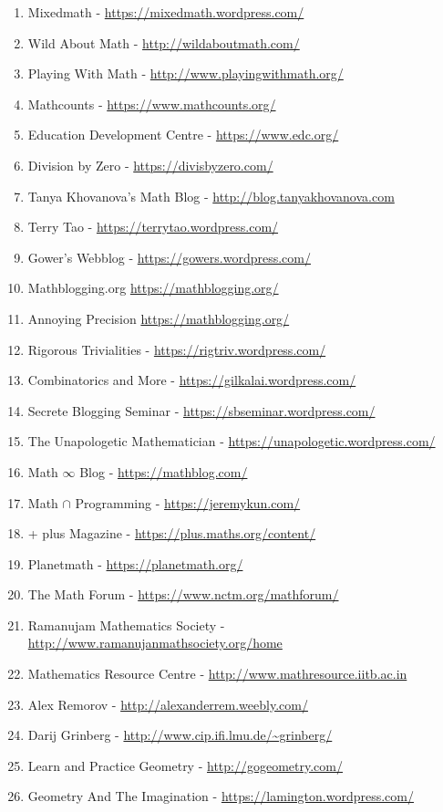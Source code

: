 \documentclass{article}
\begin{document}
\begin{enumerate}
\item Mixedmath - \url{https://mixedmath.wordpress.com/}
\item Wild About Math - \url{http://wildaboutmath.com/}
\item Playing With Math - \url{http://www.playingwithmath.org/}
\item Mathcounts - \url{https://www.mathcounts.org/}
\item Education Development Centre - \url{https://www.edc.org/}
\item Division by Zero - \url{https://divisbyzero.com/}
\item Tanya Khovanova's Math Blog - \url{http://blog.tanyakhovanova.com}
\item Terry Tao - \url{https://terrytao.wordpress.com/}\item Gower's Webblog - \url{https://gowers.wordpress.com/}
\item Mathblogging.org \url{https://mathblogging.org/}
\item Annoying Precision \url{https://mathblogging.org/}
\item Rigorous Trivialities - \url{https://rigtriv.wordpress.com/}
\item Combinatorics and More - \url{https://gilkalai.wordpress.com/}
\item Secrete Blogging Seminar - \url{https://sbseminar.wordpress.com/}
\item The Unapologetic Mathematician - \url{https://unapologetic.wordpress.com/}
\item Math $\infty$ Blog - \url{https://mathblog.com/}
\item Math $\cap $ Programming - \url{https://jeremykun.com/}
\item + plus Magazine - \url{https://plus.maths.org/content/}
\item Planetmath - \url{https://planetmath.org/}
\item The Math Forum - \url{https://www.nctm.org/mathforum/}
\item Ramanujam Mathematics Society - \url{http://www.ramanujanmathsociety.org/home}
\item Mathematics Resource Centre - \url{http://www.mathresource.iitb.ac.in}
\item Alex Remorov - \url{http://alexanderrem.weebly.com/}
\item Darij Grinberg - \url{http://www.cip.ifi.lmu.de/~grinberg/}
\item Learn and Practice Geometry - \url{http://gogeometry.com/}
\item Geometry And The Imagination - \url{https://lamington.wordpress.com/}

\end{enumerate}
\end{document}
